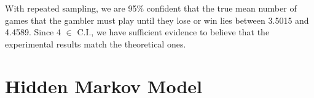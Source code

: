 \documentclass[a4paper,12pt]{article}
\theoremstyle{definition}
\begin{document}
With repeated sampling, we are 95\% confident that the true mean number of games that the gambler must play until they lose or win lies 
between 3.5015 and 4.4589. Since 4 $\in$ C.I., we have sufficient evidence to believe that the experimental results match the theoretical 
ones.

\section{Hidden Markov Model}


\clearpage







\end{document}
